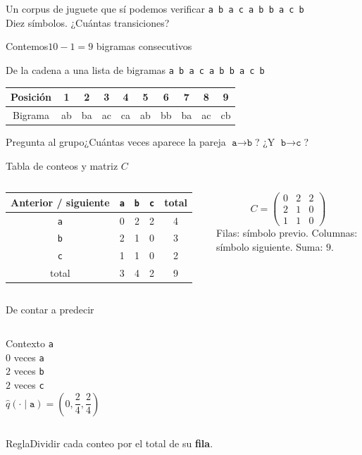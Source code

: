 \documentclass[aspectratio=169,10pt]{beamer}
\begin{document}
\begin{frame}{Un corpus de juguete que sí podemos verificar}
\centering\Large\texttt{a b a c a b b a c b}\\[6mm]
\normalsize Diez símbolos. ¿Cuántas transiciones?\\[4mm]
\begin{block}{Contemos}\centering $10-1=9$ bigramas consecutivos\end{block}
\end{frame}

\begin{frame}{De la cadena a una lista de bigramas}
\centering\normalsize \texttt{a b a c a b b a c b}\\[3mm]
\begin{tabular}{c|ccccccccc}\toprule Posición&1&2&3&4&5&6&7&8&9\\\midrule Bigrama&ab&ba&ac&ca&ab&bb&ba&ac&cb\\\bottomrule\end{tabular}
\vspace{5mm}\begin{block}{Pregunta al grupo}\centering ¿Cuántas veces aparece la pareja $\texttt{a}\to\texttt{b}$? ¿Y $\texttt{b}\to\texttt{c}$?\end{block}
\end{frame}

\begin{frame}{Tabla de conteos y matriz $C$}
\begin{columns}
\centering\begin{tabular}{c|ccc|c}\toprule Anterior / siguiente&\texttt{a}&\texttt{b}&\texttt{c}&total\\\midrule
\texttt{a}&0&2&2&4\\\texttt{b}&2&1&0&3\\\texttt{c}&1&1&0&2\\\midrule total&3&4&2&9\\\bottomrule\end{tabular}
\[C=\begin{pmatrix}0&2&2\\2&1&0\\1&1&0\end{pmatrix}\]
\small Filas: símbolo previo. Columnas: símbolo siguiente. Suma: $9$.
\end{columns}
\end{frame}

\begin{frame}{De contar a predecir}
\begin{columns}\centering Contexto \texttt{a}\\[4mm] $0$ veces \texttt{a}\\$2$ veces \texttt{b}\\$2$ veces \texttt{c}
\centering\[\widehat q(\cdot\mid\texttt{a})=\left(0,\frac24,\frac24\right)\]
\end{columns}
\vspace{4mm}\begin{block}{Regla}\centering Dividir cada conteo por el total de su \textbf{fila}.\end{block}
\end{frame}
\end{document}
